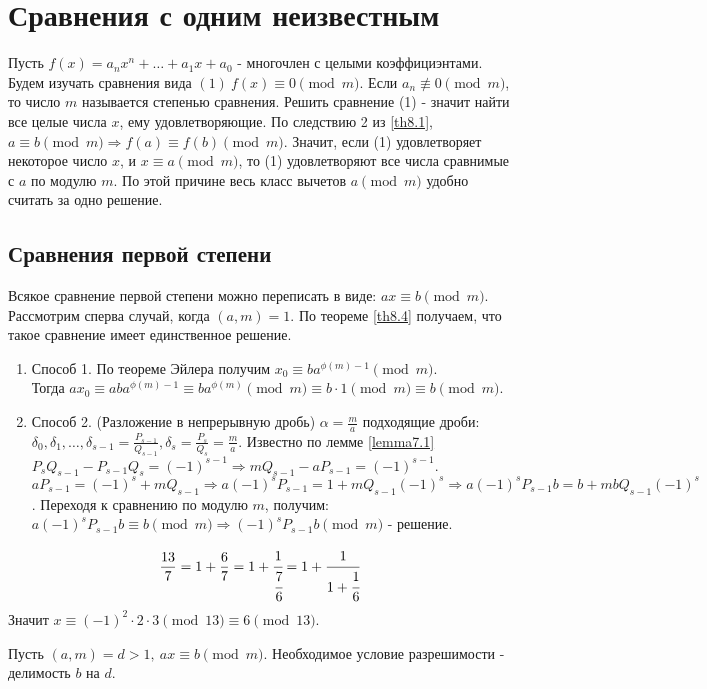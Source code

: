 \section{Сравнения с одним неизвестным}
    Пусть $f(x)=a_nx^n+\dots+a_1x+a_0$ - многочлен с целыми коэффициэнтами. Будем изучать сравнения вида $(1)\ f(x)\equiv 0\pmod{m}$. Если $a_n\not\equiv 0\pmod{m}$, то число $m$ называется степенью сравнения. Решить сравнение (1) - значит найти все целые числа $x$, ему удовлетворяющие. По следствию 2 из \ref{th8.1},\ $a\equiv b\pmod{m}\Rightarrow f(a)\equiv f(b)\pmod{m}$. Значит, если (1) удовлетворяет некоторое число $x$, и $x\equiv a\pmod{m}$, то (1) удовлетворяют все числа сравнимые с $a$ по модулю $m$. По этой причине весь класс вычетов $a \pmod{m}$ удобно считать за одно решение.
    \subsection*{Сравнения первой степени}
    Всякое сравнение первой степени можно переписать в виде: $ax\equiv b\pmod{m}$. Рассмотрим сперва случай, когда $(a,m)=1$. По теореме \ref{th8.4} получаем, что такое сравнение имеет единственное решение.
    \begin{enumerate}
        \item Способ 1. По теореме Эйлера получим $x_0\equiv ba^{\phi(m)-1}\pmod{m}$.\\
        Тогда $ax_0\equiv aba^{\phi(m)-1}\equiv ba^{\phi(m)}\pmod{m}\equiv b\cdot 1 \pmod{m}\equiv b\pmod{m}$.
        \item Способ 2. (Разложение в непрерывную дробь)
        $\alpha=\frac{m}{a}$ подходящие дроби: $\delta_0,\delta_1,\dots,\delta_{s-1}=\frac{P_{s-1}}{Q_{s-1}}, \delta_s=\frac{P_s}{Q_s}=\frac{m}{a}$. Известно по лемме \ref{lemma7.1} $P_s Q_{s-1}-P_{s-1}Q_s=(-1)^{s-1}\Rightarrow mQ_{s-1}-aP_{s-1}=(-1)^{s-1}$. $aP_{s-1}=(-1)^s+mQ_{s-1}\Rightarrow a(-1)^s P_{s-1}=1+mQ_{s-1}(-1)^s\Rightarrow a(-1)^sP_{s-1}b=b+mbQ_{s-1}(-1)^s$. Переходя к сравнению по модулю $m$, получим: $a(-1)^s P_{s-1}b\equiv b \pmod{m}\Rightarrow (-1)^sP_{s-1}b\pmod{m}$ - решение.
    \end{enumerate}
    \begin{example}
        \[\frac{13}{7}=1+\frac{6}{7}=1+\cfrac{1}{\cfrac{7}{6}}=1+\cfrac{1}{1+\cfrac{1}{6}}\]
        Значит $x\equiv (-1)^2\cdot 2\cdot 3 \pmod{13}\equiv 6\pmod{13}$.
    \end{example}
    Пусть $(a,m)=d>1,\ ax\equiv b\pmod{m}$. Необходимое условие разрешимости - делимость $b$ на $d$.
